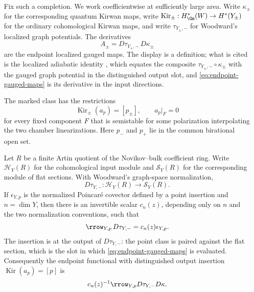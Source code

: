 Fix such a completion.  We work coefficientwise at sufficiently large area.
Write \(\kappa_\pm\) for
the corresponding quantum Kirwan maps, write
\(\operatorname{Kir}_\pm:H^*_{\Gm}(W)\to H^*(Y_\pm)\) for the ordinary
cohomological Kirwan maps, and write \(\tau_{Y_\pm,-}\) for Woodward's
localized graph potentials.  The
derivatives
\begin{equation}\label{eq:endpoint-gauged-maps}
 A_\pm=D\tau_{Y_\pm,-}\,D\kappa_\pm
\end{equation}
are the endpoint localized gauged maps.  The display is a definition; what is
cited is the localized adiabatic identity
\cite[Equation~(68)]{WoodwardQKIII}, which equates the composite
\(\tau_{Y_\pm,-}\circ\kappa_\pm\) with the gauged graph potential in the
distinguished output slot, and \eqref{eq:endpoint-gauged-maps} is its
derivative in the input directions.

The marked class has the restrictions
\begin{equation}\label{eq:marked-class-restrictions}
 \operatorname{Kir}_\pm(a_p)=[p_\pm],\qquad
 a_p|_F=0
\end{equation}
for every fixed component \(F\) that is semistable for some polarization
interpolating the two chamber linearizations.
Here \(p_-\) and \(p_+\) lie in the common birational open set.

\begin{lemma}
\label{lem:point-insertion-row}
Let \(R\) be a finite Artin quotient of the Novikov--bulk coefficient ring.
Write \(\mathcal H_Y(R)\) for the cohomological input module and
\(\mathcal S_Y(R)\) for the corresponding module of flat sections.  With
Woodward's graph-space normalization,
\[
 D\tau_{Y,-}:\mathcal H_Y(R)\longrightarrow\mathcal S_Y(R).
\]
If \(\epsilon_{Y,p}\) is the normalized Poincar\'e covector defined by a
point insertion and \(n=\dim Y\), then there is an invertible scalar
\(c_n(z)\), depending only on \(n\) and the two normalization conventions,
such that
\begin{equation}\label{eq:point-insertion-row}
 \rrow_{Y,p}\,D\tau_{Y,-}=c_n(z)\epsilon_{Y,p}.
\end{equation}
The insertion is at the output of \(D\tau_{Y,-}\): the point class is paired
against the flat section, which is the slot in which
\eqref{eq:endpoint-gauged-maps} is evaluated.
Consequently the endpoint functional with distinguished output insertion
\(\operatorname{Kir}(a_p)=[p]\) is
\[
 c_n(z)^{-1}\rrow_{Y,p}D\tau_{Y,-}D\kappa.
\]
\end{lemma}

